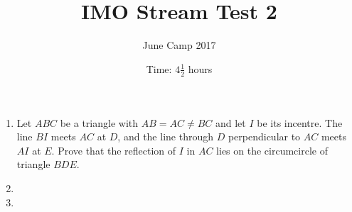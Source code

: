 \documentclass{article}
\title{IMO Stream Test 2}
\author{June Camp 2017}
\date{Time: $4\frac{1}{2}$ hours}
\begin{document}
 \maketitle

\begin{enumerate}

\item %
	Let $ABC$ be a triangle with $AB = AC \neq BC$ and let $I$ be its incentre. The line $BI$ meets $AC$ at $D$, and the line through $D$ perpendicular to $AC$ meets $AI$ at $E$. Prove that the reflection of $I$ in $AC$ lies on the circumcircle of triangle $BDE$.

\item %
	

\item %
		

\end{enumerate}
\end{document}
